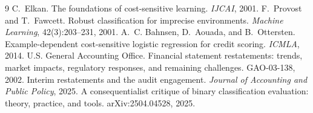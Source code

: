\documentclass[11pt]{article}
\begin{document}

\begin{thebibliography}{9}
\small
{}
C.~Elkan. The foundations of cost-sensitive learning. \emph{IJCAI}, 2001.
F.~Provost and T.~Fawcett. Robust classification for imprecise environments.
\emph{Machine Learning}, 42(3):203--231, 2001.
A.~C. Bahnsen, D.~Aouada, and B.~Ottersten. Example-dependent cost-sensitive logistic regression
for credit scoring. \emph{ICMLA}, 2014.
U.S. General Accounting Office. Financial statement restatements: trends, market impacts,
regulatory responses, and remaining challenges. GAO-03-138, 2002.
Interim restatements and the audit engagement. \emph{Journal of Accounting and Public Policy},
2025.
A consequentialist critique of binary classification evaluation: theory, practice, and tools.
arXiv:2504.04528, 2025.
\end{thebibliography}
\end{document}
